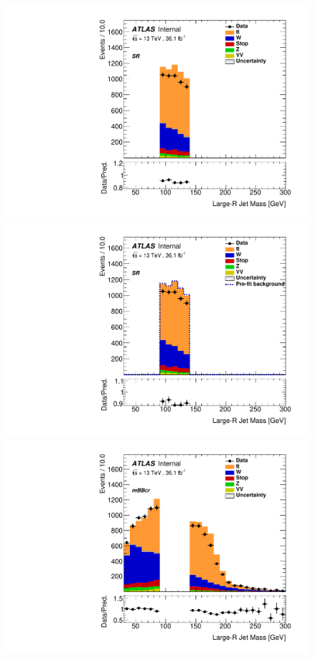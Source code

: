 \begin{figure}[!htbp]
\begin{center}
\includegraphics[scale=0.33]{./figures/boosted/ABCD_1tag0bjet/QCDFloat_1tag_SRFit_SR_Mu_Prefit}
\includegraphics[scale=0.33]{./figures/boosted/ABCD_1tag0bjet/QCDFloat_1tag_SRFit_SR_Mu_Postfit}\\
\includegraphics[scale=0.33]{./figures/boosted/ABCD_1tag0bjet/QCDFloat_1tag_mBBcrFit_mBBcr_Mu_Prefit}  

\end{center}
\end{figure}

